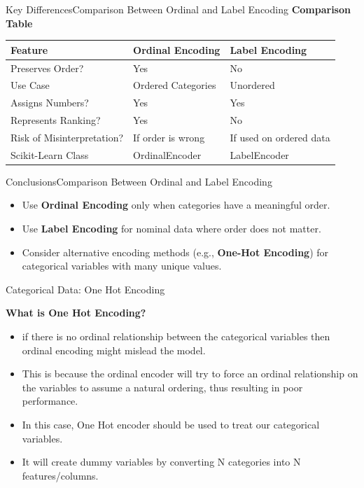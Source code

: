 \documentclass[11pt]{beamer}
\begin{document}
\begin{frame}{Key Differences}{Comparison Between Ordinal and Label Encoding}
    \textbf{Comparison Table}
    \begin{table}[]
        \centering
        \begin{tabular}{lll}
            \toprule
            \textbf{Feature} & \textbf{Ordinal Encoding} & \textbf{Label Encoding} \\
            \midrule
            Preserves Order?  & Yes & No  \\
            Use Case         & Ordered Categories & Unordered \\
            Assigns Numbers?  & Yes & Yes \\
            Represents Ranking? & Yes & No \\
            Risk of Misinterpretation? & If order is wrong & If used on ordered data \\
            Scikit-Learn Class & OrdinalEncoder & LabelEncoder \\
            \bottomrule
        \end{tabular}
    \end{table}
\end{frame}
%
%
\begin{frame}{Conclusions}{Comparison Between Ordinal and Label Encoding}
    \begin{itemize}
        \item Use \textbf{Ordinal Encoding} only when categories have a meaningful order.
        \item Use \textbf{Label Encoding} for nominal data where order does not matter.
        \item Consider alternative encoding methods (e.g., \textbf{One-Hot Encoding}) for categorical variables with many unique values.
    \end{itemize}
\end{frame}
%
%
\begin{frame}{Categorical Data: One Hot Encoding}

\textbf{What is One Hot Encoding?}

	\begin{itemize}
		\item if there is no ordinal relationship between the categorical variables then ordinal encoding might mislead the model. 
		\item This is because the ordinal encoder will try to force an ordinal relationship on the variables to assume a natural ordering, thus resulting in poor performance.
		\item In this case, One Hot encoder should be used to treat our categorical variables. 
		\item It will create dummy variables by converting N categories into N features/columns. 
	\end{itemize}
\end{frame}
\end{document}
